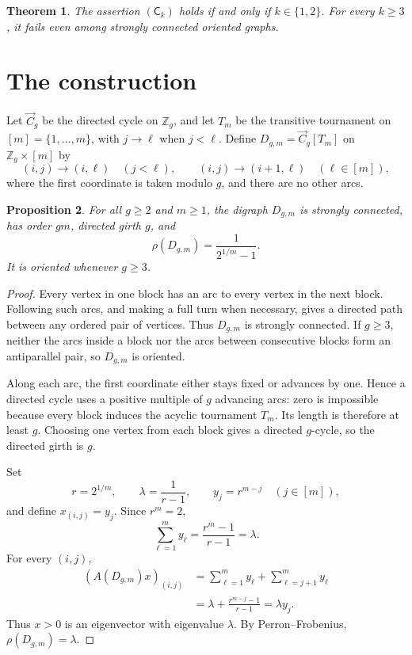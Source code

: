 \documentclass[11pt]{amsart}
\newtheorem{theorem}{Theorem}
\newtheorem{proposition}[theorem]{Proposition}
\theoremstyle{remark}
\begin{document}
\begin{theorem}\label{thm:main}
The assertion $(\mathsf C_k)$ holds if and only if $k\in\{1,2\}$. For every
$k\ge3$, it fails even among strongly connected oriented graphs.
\end{theorem}

\section{The construction}

Let $\vec C_g$ be the directed cycle on $\mathbb Z_g$, and let $T_m$ be the
transitive tournament on $[m]=\{1,\dots,m\}$, with $j\to\ell$ when
$j<\ell$. Define $D_{g,m}=\vec C_g[T_m]$ on $\mathbb Z_g\times[m]$ by
\[
 (i,j)\to(i,\ell)\quad(j<\ell),
 \qquad
 (i,j)\to(i+1,\ell)\quad(\ell\in[m]),
\]
where the first coordinate is taken modulo $g$, and there are no other arcs.

\begin{proposition}\label{prop:family}
For all $g\ge2$ and $m\ge1$, the digraph $D_{g,m}$ is strongly connected,
has order $gm$, directed girth $g$, and
\[
 \rho(D_{g,m})=\frac{1}{2^{1/m}-1}.
\]
It is oriented whenever $g\ge3$.
\end{proposition}

\begin{proof}
Every vertex in one block has an arc to every vertex in the next block.
Following such arcs, and making a full turn when necessary, gives a directed
path between any ordered pair of vertices. Thus $D_{g,m}$ is strongly
connected. If $g\ge3$, neither the arcs inside a block nor the arcs between
consecutive blocks form an antiparallel pair, so $D_{g,m}$ is oriented.

Along each arc, the first coordinate either stays fixed or advances by one.
Hence a directed cycle uses a positive multiple of $g$ advancing arcs: zero
is impossible because every block induces the acyclic tournament $T_m$.
Its length is therefore at least $g$. Choosing one vertex from each block
gives a directed $g$-cycle, so the directed girth is $g$.

Set
\[
 r=2^{1/m},\qquad \lambda=\frac{1}{r-1},\qquad
 y_j=r^{m-j}\quad(j\in[m]),
\]
and define $x_{(i,j)}=y_j$. Since $r^m=2$,
\[
 \sum_{\ell=1}^m y_\ell=\frac{r^m-1}{r-1}=\lambda.
\]
For every $(i,j)$,
\[
 \begin{aligned}
 (A(D_{g,m})x)_{(i,j)}
 &=\sum_{\ell=1}^m y_\ell+\sum_{\ell=j+1}^m y_\ell \\
 &=\lambda+\frac{r^{m-j}-1}{r-1}
 =\lambda y_j.
 \end{aligned}
\]
Thus $x>0$ is an eigenvector with eigenvalue $\lambda$. By
Perron--Frobenius, $\rho(D_{g,m})=\lambda$.
\end{proof}
\end{document}

